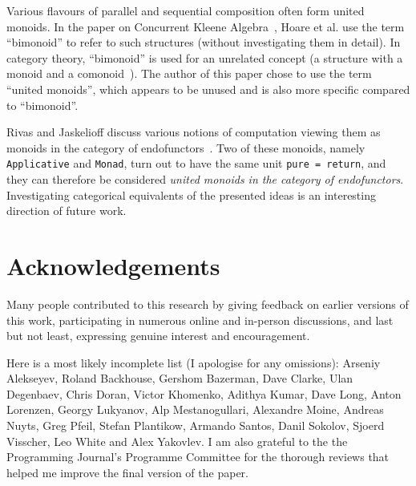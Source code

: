 \documentclass[english,submission]{programming}
\newcommand{\hcode}[1]{{\color{darkblue} \lstinline[keywordstyle={}]|#1|}} %
\begin{document}
Various flavours of parallel and sequential composition often form united
monoids. In the paper on Concurrent Kleene Algebra~\cite{hoare2011concurrent},
Hoare et al. use the term ``bimonoid'' to refer to such structures (without
investigating them in detail). In category theory, ``bimonoid'' is used for an
unrelated concept (a structure with a monoid and a
comonoid~\cite{porst_bimonoids}). The author of this paper chose to use the term
``united monoids'', which appears to be unused and is also more specific
compared to ``bimonoid''.

Rivas and Jaskelioff discuss various notions of computation viewing them as
monoids in the category of endofunctors~\cite{rivas_jaskelioff_2017}. Two of
these monoids, namely \hcode{Applicative} and \hcode{Monad}, turn out to have
the same unit \hcode{pure = return}, and they can therefore be considered
\emph{united monoids in the category of endofunctors}. Investigating categorical
equivalents of the presented ideas is an interesting direction of future work.

\section*{Acknowledgements}
Many people contributed to this research by giving feedback on earlier versions
of this work, participating in numerous online and in-person discussions, and
last but not least, expressing genuine interest and encouragement.

Here is a most likely incomplete list (I apologise for any omissions):
Arseniy Alekseyev, Roland Backhouse, Gershom Bazerman,
Dave Clarke, Ulan Degenbaev, Chris Doran, Victor Khomenko, Adithya Kumar,
Dave Long, Anton Lorenzen, Georgy Lukyanov, Alp Mestanogullari, Alexandre Moine,
Andreas Nuyts, Greg Pfeil, Stefan Plantikow, Armando Santos, Danil Sokolov,
Sjoerd Visscher, Leo White and Alex Yakovlev. I am also grateful to the the
Programming Journal's Programme Committee for the thorough reviews that helped
me improve the final version of the paper.

\printbibliography
\end{document}
